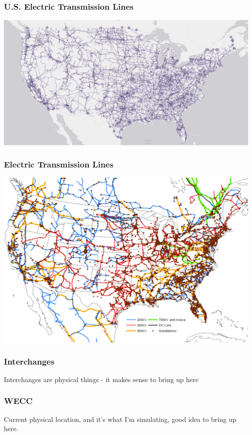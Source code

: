 \documentclass[14pt, unknownkeysallowed]{beamer}
\begin{document}
\begin{frame}
\frametitle{U.S. Electric Transmission Lines}
{\centering
\includegraphics[width=\linewidth]{UStransmission} %
}
\end{frame}
\begin{frame}
\frametitle{Electric Transmission Lines}
{\centering
\includegraphics[height=.9\textheight]{xgridPlusSubs} %

}
\end{frame}
\begin{frame}
\frametitle{Interchanges}
Interchanges are physical things - it makes sense to bring up here
%
\end{frame}
\begin{frame}
\frametitle{WECC}
Current physical location, and it's what I'm simulating, good idea to bring up here.
\end{frame}
\end{document}
